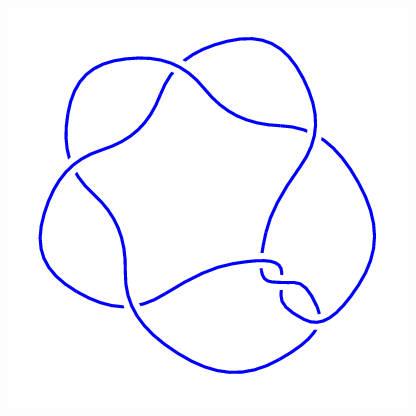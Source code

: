 \begin{figure}[H]
\begin{minipage}[b]{.18\linewidth}
	\end{minipage}
	\begin{minipage}[b]{.18\linewidth}
		\centering
		\includegraphics[width=\linewidth]{../data/7_3.png}
	\end{minipage}
\end{figure}
